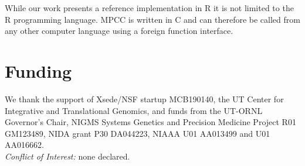 \documentclass{bioinfo}
\begin{document}
While our work presents a reference implementation in R it is not
limited to the R programming language. MPCC is written in C and can
therefore be called from any other computer language using a foreign
function interface.

\section*{Funding}

We thank the support of Xsede/NSF startup MCB190140, the UT Center for
Integrative and Translational Genomics, and funds from the UT-ORNL
Governor's Chair, NIGMS Systems Genetics and Precision Medicine
Project R01 GM123489, NIDA grant P30 DA044223, NIAAA U01 AA013499 and
U01 AA016662.\\
\textit{Conflict of Interest:} none declared.

\vspace*{-5mm}


\end{document}
